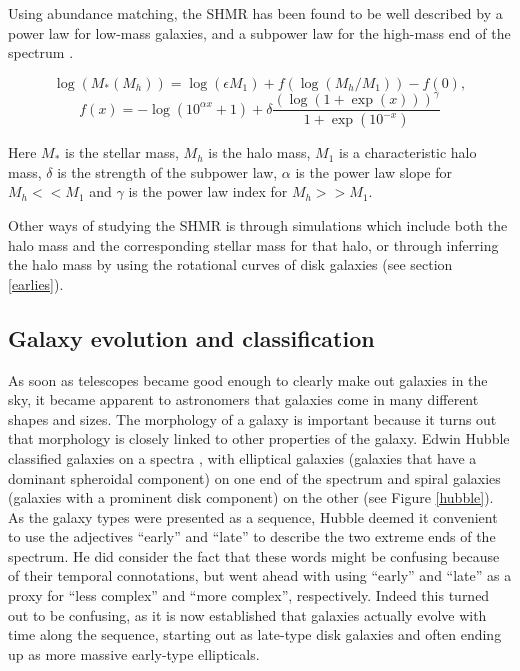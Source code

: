 Using abundance matching, the SHMR has been found to be well described by a power law for low-mass galaxies, and a subpower law for the high-mass end of the spectrum \parencite{Behroozi2013}. 

\begin{equation}
    \log(M_*(M_h)) = \log(\epsilon M_1) + f(\log(M_h/M_1)) -f(0),
\end{equation}
\begin{equation*}
    f(x) = -\log(10^{\alpha x}+1)+\delta \frac{(\log(1+\exp(x)))^\gamma}{1 +\exp(10^{-x})}
\end{equation*}

Here $M_*$ is the stellar mass, $M_h$ is the halo mass, $M_1$ is a characteristic halo mass, $\delta$ is the strength of the subpower law, $\alpha$ is the power law slope for $M_h << M_1$ and $\gamma$ is the power law index for $M_h >> M_1$.

Other ways of studying the SHMR is through simulations which include both the halo mass and the corresponding stellar mass for that halo, or through inferring the halo mass by using the rotational curves of disk galaxies (see section \ref{earlies}).

\subsection{Galaxy evolution and classification}
As soon as telescopes became good enough to clearly make out galaxies in the sky, it became apparent to astronomers that galaxies come in many different shapes and sizes. The morphology of a galaxy is important because it turns out that morphology is closely linked to other properties of the galaxy. Edwin Hubble classified galaxies on a spectra \parencite{Hubble1926}, with elliptical galaxies (galaxies that have a dominant spheroidal component) on one end of the spectrum and spiral galaxies (galaxies with a prominent disk component) on the other (see Figure \ref{hubble}). As the galaxy types were presented as a sequence, Hubble deemed it convenient to use the adjectives ``early'' and ``late'' to describe the two extreme ends of the spectrum. He did consider the fact that these words might be confusing because of their temporal connotations, but went ahead with using ``early'' and ``late'' as a proxy for ``less complex'' and ``more complex'', respectively. Indeed this turned out to be confusing, as it is now established that galaxies actually evolve with time along the sequence, starting out as late-type disk galaxies and often ending up as more massive early-type ellipticals.

